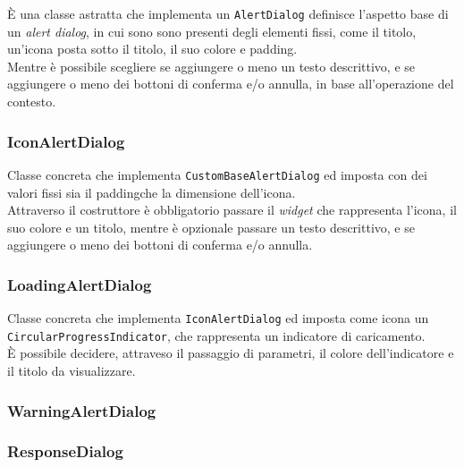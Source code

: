 È una classe astratta che implementa un \lstinline{AlertDialog}\cite{site:alert-dialog}  definisce l'aspetto base di un \emph{alert dialog}, in cui sono sono presenti degli elementi fissi, come il titolo, un'icona posta sotto il titolo, il suo colore e \gls{padding}\glsoccur.\\
Mentre è possibile scegliere se aggiungere o meno un testo descrittivo, e se aggiungere o meno dei bottoni di conferma e/o annulla, in base all'operazione del contesto.\\

\subsubsection*{IconAlertDialog}
\label{subsubsec:icon-alert-dialog}

Classe concreta che implementa \lstinline{CustomBaseAlertDialog} ed imposta con dei valori fissi sia il \gls{padding}\glsoccur che la dimensione dell'icona.\\
Attraverso il costruttore è obbligatorio passare il \emph{widget} che rappresenta l'icona, il suo colore e un titolo, mentre è opzionale passare un testo descrittivo, e se aggiungere o meno dei bottoni di conferma e/o annulla.\\

\subsubsection*{LoadingAlertDialog}
\label{subsubsec:loading-alert-dialog}

Classe concreta che implementa \lstinline{IconAlertDialog} ed imposta come icona un \lstinline{CircularProgressIndicator}\cite{site:circular-progress-indicator}, che rappresenta un indicatore di caricamento.\\
È possibile decidere, attraveso il passaggio di parametri, il colore dell'indicatore e il titolo da visualizzare.\\

\subsubsection*{WarningAlertDialog}
\label{subsubsec:warning-alert-dialog}

\subsubsection*{ResponseDialog}
\label{subsubsec:response-dialog}

